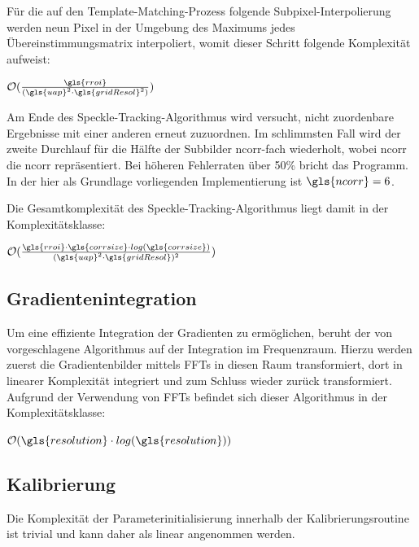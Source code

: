 Für die auf den Template-Matching-Prozess folgende Subpixel-Interpolierung werden neun Pixel in der Umgebung des Maximums jedes Übereinstimmungsmatrix interpoliert, womit dieser Schritt folgende Komplexität aufweist:

\begin{center}
	$\mathcal{O}(\frac{\gls{rroi}}{(\gls{uap}^2 \cdot \gls{gridResol}^2)})$
\end{center}

Am Ende des Speckle-Tracking-Algorithmus wird versucht, nicht zuordenbare Ergebnisse mit einer anderen   erneut zuzuordnen. Im schlimmsten Fall wird der zweite Durchlauf für die Hälfte der Subbilder \gls{ncorr}-fach wiederholt, wobei \gls{ncorr} die \glsdesc{ncorr} repräsentiert. Bei höheren Fehlerraten über 50\% bricht das Programm. In der hier als Grundlage vorliegenden Implementierung ist $\gls{ncorr} = 6$.

Die Gesamtkomplexität des Speckle-Tracking-Algorithmus liegt damit in der Komplexitätsklasse:

\begin{center}
	$\mathcal{O}(\frac{\gls{rroi} \cdot \gls{corrsize} \cdot log(\gls{corrsize})}{(\gls{uap}^2 \cdot \gls{gridResol})^2})$
\end{center}

\subsection{Gradientenintegration}

Um eine effiziente Integration der Gradienten zu ermöglichen, beruht der von \citeauthor{FC88} vorgeschlagene Algorithmus auf der Integration im Frequenzraum. Hierzu werden zuerst die Gradientenbilder mittels \glspl{FFT} in diesen Raum transformiert, dort in linearer Komplexität integriert und zum Schluss wieder zurück transformiert. 
Aufgrund der Verwendung von \glspl{FFT} befindet sich dieser Algorithmus in der Komplexitätsklasse:

\begin{center}
	$\mathcal{O}(\gls{resolution} \cdot log(\gls{resolution}))$
\end{center}

\subsection{Kalibrierung}

Die Komplexität der Parameterinitialisierung innerhalb der Kalibrierungsroutine ist trivial und kann daher als linear angenommen werden. 

